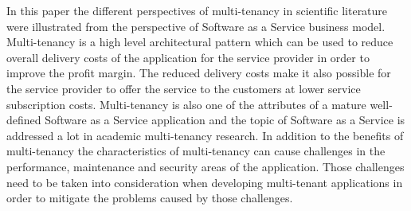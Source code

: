 \documentclass[conference]{sasmoota2017}
\begin{document}
In this paper the different perspectives of multi-tenancy in scientific literature were illustrated from the perspective of Software as a Service business model. Multi-tenancy is a high level architectural pattern which can be used to reduce overall delivery costs of the application for the service provider in order to improve the profit margin. The reduced delivery costs make it also possible for the service provider to offer the service to the customers at lower service subscription costs. Multi-tenancy is also one of the attributes of a mature well-defined Software as a Service application and the topic of Software as a Service is addressed a lot in academic multi-tenancy research. In addition to the benefits of multi-tenancy the characteristics of multi-tenancy can cause challenges in the performance, maintenance and security areas of the application. Those challenges need to be taken into consideration when developing multi-tenant applications in order to mitigate the problems caused by those challenges. 







%
%
%



%
%



\end{document}

